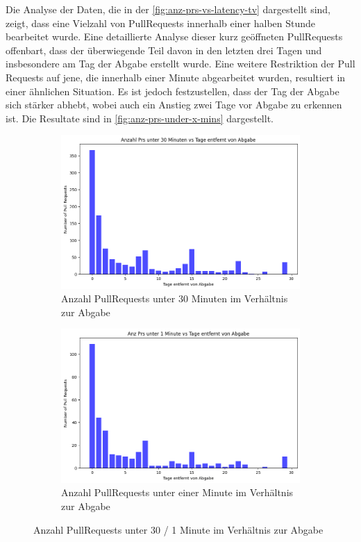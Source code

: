 \newpage
Die Analyse der Daten, die in der \autoref{fig:anz-prs-vs-latency-tv} dargestellt sind, zeigt, dass eine Vielzahl von PullRequests innerhalb einer halben Stunde bearbeitet wurde. Eine detaillierte Analyse dieser kurz geöffneten PullRequests offenbart, dass der überwiegende Teil davon in den letzten drei Tagen und insbesondere am Tag der Abgabe erstellt wurde. Eine weitere Restriktion der Pull Requests auf jene, die innerhalb einer Minute abgearbeitet wurden, resultiert in einer ähnlichen Situation. Es ist jedoch festzustellen, dass der Tag der Abgabe sich stärker abhebt, wobei auch ein Anstieg zwei Tage vor Abgabe zu erkennen ist.  Die Resultate sind in \autoref{fig:anz-prs-under-x-mins} dargestellt.

\begin{figure}[htbp]
    \centering
    \begin{subfigure}[b]{0.48\textwidth}
        \centering
        \includegraphics[width=\textwidth]{Figures/anz-prs-under-30-min.png}
    \caption{Anzahl PullRequests unter 30 Minuten im Verhältnis zur Abgabe}
    \label{fig:anz-prs-under-30-min}
    \end{subfigure}
    \hfill
    \begin{subfigure}[b]{0.48\textwidth}
        \centering
        \includegraphics[width=\textwidth]{Figures/anz-prs-under-1-min.png}
    \caption{Anzahl PullRequests unter einer Minute im Verhältnis zur Abgabe}
    \label{fig:anz-prs-under-1-min}
    \end{subfigure}
    \caption{Anzahl PullRequests unter 30 / 1 Minute im Verhältnis zur Abgabe}
    \label{fig:anz-prs-under-x-mins}
\end{figure}

